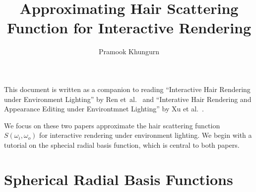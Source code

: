 \documentclass[10pt]{article}
\title{Approximating Hair Scattering Function for Interactive Rendering}
\author{Pramook Khungurn}
\begin{document}
	\maketitle

  This document is written as a companion to reading ``Interactive Hair Rendering under Environment Lighting'' by Ren et~al.~\cite{Ren:2010} and ``Interative Hair Rendering and Appearance Editing under Environtmnet Lighting'' by Xu et al.~\cite{Xu:2011}.
  
  We focus on these two papers approximate the hair scattering function $S(\omega_i, \omega_o)$ for interactive rendering under environment lighting. We begin with a tutorial on the sphecial radial basis function, which is central to both papers.
  
  \section{Spherical Radial Basis Functions}
  
\end{document}
